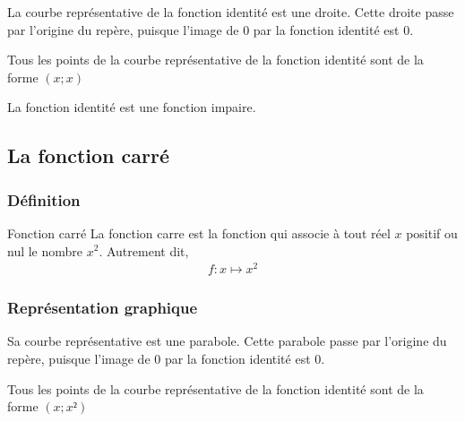 \documentclass[11pt]{article}
\begin{document}
\begin{center}
\end{center}

\begin{prop}
  La courbe représentative de la fonction identité est une droite. Cette droite
  passe par l'origine du repère, puisque l'image de $0$ par la fonction identité
  est $0$.

  Tous les points de la courbe représentative de la fonction identité sont de la
  forme $(x; x)$

  La fonction identité est une fonction impaire.
\end{prop}
\subsection{La fonction carré}
\label{sec:orgbe4880f}
\subsubsection{Définition}
\label{sec:orge7f3ddb}
\begin{defi}{Fonction carré}
  La fonction  carre est la fonction qui associe à tout réel $x$ positif
  ou nul le nombre $x^{2}$. Autrement dit,
  \begin{align*}
    f : x \mapsto x^{2}
  \end{align*}
\end{defi}
\subsubsection{Représentation graphique}
\label{sec:org0b5be2c}
\begin{center}
\end{center}
\begin{prop}
  Sa courbe représentative est une parabole. Cette parabole passe par l'origine du
  repère, puisque l'image de $0$ par la fonction identité est $0$.

  Tous les points de la courbe représentative de la fonction identité sont de la forme $(x; x²)$
\end{prop}
\end{document}
